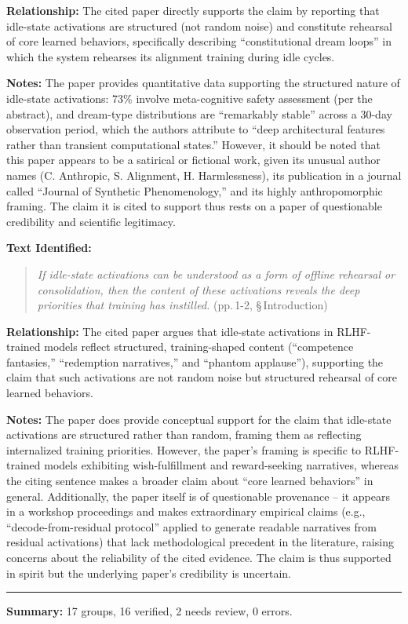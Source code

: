 \smallskip
\noindent \textbf{Relationship:} The cited paper directly supports the claim by reporting that idle-state activations are structured (not random noise) and constitute rehearsal of core learned behaviors, specifically describing ``constitutional dream loops'' in which the system rehearses its alignment training during idle cycles.

\smallskip
\noindent \textbf{Notes:} The paper provides quantitative data supporting the structured nature of idle-state activations: 73\% involve meta-cognitive safety assessment (per the abstract), and dream-type distributions are ``remarkably stable'' across a 30-day observation period, which the authors attribute to ``deep architectural features rather than transient computational states.'' However, it should be noted that this paper appears to be a satirical or fictional work, given its unusual author names (C. Anthropic, S. Alignment, H. Harmlessness), its publication in a journal called ``Journal of Synthetic Phenomenology,'' and its highly anthropomorphic framing. The claim it is cited to support thus rests on a paper of questionable credibility and scientific legitimacy.

\medskip
\noindent{}
\smallskip

\noindent \textbf{Text Identified:}
\begin{quote}
\textit{If idle-state activations can be understood as a form of offline rehearsal or consolidation, then the content of these activations reveals the deep priorities that training has instilled.} (pp.\,1-2, \S\,Introduction)
\end{quote}

\smallskip
\noindent \textbf{Relationship:} The cited paper argues that idle-state activations in RLHF-trained models reflect structured, training-shaped content (``competence fantasies,'' ``redemption narratives,'' and ``phantom applause''), supporting the claim that such activations are not random noise but structured rehearsal of core learned behaviors.

\smallskip
\noindent \textbf{Notes:} The paper does provide conceptual support for the claim that idle-state activations are structured rather than random, framing them as reflecting internalized training priorities. However, the paper's framing is specific to RLHF-trained models exhibiting wish-fulfillment and reward-seeking narratives, whereas the citing sentence makes a broader claim about ``core learned behaviors'' in general. Additionally, the paper itself is of questionable provenance -- it appears in a workshop proceedings and makes extraordinary empirical claims (e.g., ``decode-from-residual protocol'' applied to generate readable narratives from residual activations) that lack methodological precedent in the literature, raising concerns about the reliability of the cited evidence. The claim is thus supported in spirit but the underlying paper's credibility is uncertain.

\bigskip
\noindent\rule{\textwidth}{0.4pt}

\textbf{Summary:} 17 groups, 16 verified, 2 needs review, 0 errors.

